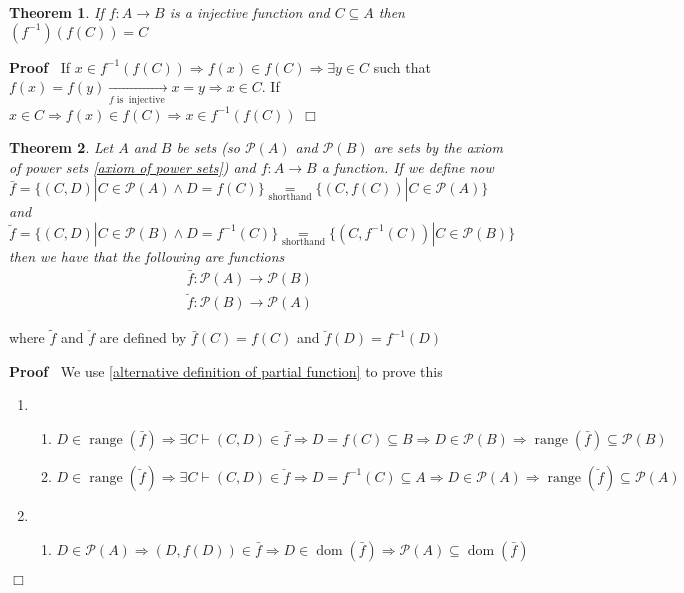 \documentclass{book}
\newcommand{\Rightarrowlim}{\mathop{\rightarrow}\limits}
\newcommand{\equallim}{\mathop{=}\limits}
\newcommand{\nobracket}{}
\newcommand{\tmop}[1]{\ensuremath{\operatorname{#1}}}
\newenvironment{proof}{\noindent\textbf{Proof\ }}{\hspace*{\fill}$\Box$\medskip}
\newtheorem{theorem}{Theorem}
\begin{document}
{{\begin{theorem}
  \label{injective function and preimage/image}If $f : A \rightarrow B$ is a
  injective function and $C \subseteq A$ then $(f^{- 1}) (f (C)) = C$
\end{theorem}

\begin{proof}
  If $x \in f^{- 1} (f (C)) \Rightarrow f (x) \in f (C) \Rightarrow \exists y
  \in C$ such that $f (x) = f (y) \Rightarrowlim_{f \tmop{is}
  \tmop{injective}} x = y \Rightarrow x \in C$. If $x \in C \Rightarrow f (x)
  \in f (C) \Rightarrow x \in f^{- 1} (f (C))$
\end{proof}

\begin{theorem}
  Let $A$ and $B$ be sets (so $\mathcal{P} (A)$ and $\mathcal{P} (B)$ are sets
  by the axiom of power sets \ref{axiom of power sets}) and $f : A \rightarrow
  B$ a function. If we define now $\bar{f} = \{ (C, D) | C \in \mathcal{P} (A)
  \wedge D = f (C) \nobracket \} \equallim_{\tmop{shorthand}} \{ (C, f (C)) |
  C \in \mathcal{P} (A) \nobracket \}$ and $\breve{f} = \{ (C, D) | C \in
  \mathcal{P} (B) \wedge D = f^{- 1} (C) \nobracket \}
  \equallim_{\tmop{shorthand}} \{ (C, f^{- 1} (C)) | C \in \mathcal{P} (B)
  \nobracket \}$ then we have that the following are functions
  \begin{eqnarray*}
    \bar{f} : \mathcal{P} (A) \rightarrow \mathcal{P} (B) &  & \\
    \breve{f} : \mathcal{P} (B) \rightarrow \mathcal{P} (A) &  & 
  \end{eqnarray*}
\end{theorem}

where $\tilde{f}$ and $\check{f}$ are defined by $\bar{f} (C) = f (C)$ and
$\breve{f} (D) = f^{- 1} (D)$

\begin{proof}
  We use \ref{alternative definition of partial function} to prove this
  \begin{enumerate}
    \item
    \begin{enumerate}
      \item $D \in \tmop{range} (\bar{f}) \Rightarrow \exists C \vdash (C, D)
      \in \bar{f} \Rightarrow D = f (C) \subseteq B \Rightarrow D \in
      \mathcal{P} (B) \Rightarrow \tmop{range} (\bar{f}) \subseteq \mathcal{P}
      (B)$
      
      \item $D \in \tmop{range} (\breve{f}) \Rightarrow \exists C \vdash (C,
      D) \in \breve{f} \Rightarrow D = f^{- 1} (C) \subseteq A \Rightarrow D
      \in \mathcal{P} (A) \Rightarrow \tmop{range} (\breve{f}) \subseteq
      \mathcal{P} (A)$
    \end{enumerate}
    \item
    \begin{enumerate}
      \item $D \in \mathcal{P} (A) \Rightarrow (D, f (D)) \in \bar{f}
      \Rightarrow D \in \tmop{dom} (\bar{f}) \Rightarrow \mathcal{P} (A)
      \subseteq \tmop{dom} (\bar{f})$
      

\end{enumerate}
\end{enumerate}
\end{proof}}}
\end{document}
